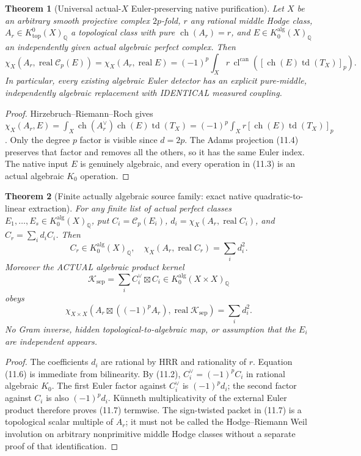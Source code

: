 \documentclass[11pt]{article}
\newcommand{\Q}{\mathbb Q}
\newcommand{\ch}{\operatorname{ch}}
\newcommand{\td}{\operatorname{td}}
\newcommand{\cl}{\operatorname{cl}}
\newtheorem{theorem}{Theorem}[section]
\begin{document}
\begin{theorem}[Universal actual-\(X\) Euler-preserving native purification]
Let \(X\) be an arbitrary smooth projective
complex \(2p\)-fold, \(r\) any rational middle Hodge
class, \(A_r\in K^0_{\mathrm{top}}(X)_\Q\) a
topological class with pure \(\ch(A_r)=r\),
and \(E\in K_0^{\mathrm{alg}}(X)_\Q\)
an \emph{independently given actual algebraic perfect complex}.
Then
\[
 \boxed{
  \chi_X(A_r,\operatorname{real}\mathcal C_p(E))
   =\chi_X(A_r,\operatorname{real}E)
   =(-1)^p\int_Xr\,\cl^{\mathrm{can}}
      ([\ch(E)\td(T_X)]_p).
 }                                                       \tag{11.5}
\]
In particular, every existing algebraic Euler detector
has an explicit pure-middle, independently algebraic
replacement with IDENTICAL measured coupling.
\end{theorem}
\begin{proof}
Hirzebruch--Riemann--Roch gives
\(
 \chi_X(A_r,E)
 =\int_X\ch(A_r^\vee)\ch(E)\td(T_X)
 =(-1)^p\int_Xr[\ch(E)\td(T_X)]_p
\).
Only the degree \(p\) factor is visible since \(d=2p\).
The Adams projection (11.4) preserves that factor
and removes all the others, so it has the same
Euler index. The native input \(E\) is genuinely
algebraic, and every operation in (11.3) is
an actual algebraic \(K_0\) operation.
\end{proof}

\begin{theorem}[Finite actually algebraic source family: exact native quadratic-to-linear extraction]
For any finite list of actual perfect classes
\(E_1,\ldots,E_s\in K_0^{\mathrm{alg}}(X)_\Q\),
put \(C_i=\mathcal C_p(E_i)\),
\(d_i=\chi_X(A_r,\operatorname{real}C_i)\),
and \(C_r=\sum_i d_i C_i\). Then
\[
 \boxed{
 C_r\in K_0^{\mathrm{alg}}(X)_\Q,\quad
 \chi_X(A_r,\operatorname{real}C_r)=\sum_i d_i^2.
 }                                                       \tag{11.6}
\]
Moreover the ACTUAL algebraic product kernel
\[
 \mathcal K_{\mathrm{sep}}=\sum_i C_i^\vee\boxtimes C_i
             \in K_0^{\mathrm{alg}}(X\times X)_\Q
\]
obeys
\[
 \boxed{
 \chi_{X\times X}
   (A_r\boxtimes((-1)^pA_r),\operatorname{real}
       \mathcal K_{\mathrm{sep}})
       =\sum_i d_i^2 .}                             \tag{11.7}
\]
No Gram inverse, hidden topological-to-algebraic map,
or assumption that the \(E_i\) are independent appears.
\end{theorem}
\begin{proof}
The coefficients \(d_i\) are rational
by HRR and rationality of \(r\).
Equation (11.6) is immediate from bilinearity.
By (11.2), \(C_i^\vee=(-1)^pC_i\)
in rational algebraic \(K_0\).
The first Euler factor against \(C_i^\vee\)
is \((-1)^pd_i\); the second factor against
\(C_i\) is also \((-1)^pd_i\).
K\"unneth multiplicativity of the external Euler product
therefore proves (11.7) termwise.
The sign-twisted packet in (11.7) is a topological
scalar multiple of \(A_r\); it must not be called
the Hodge--Riemann Weil involution on arbitrary
nonprimitive middle Hodge classes without a
separate proof of that identification.
\end{proof}
\end{document}

